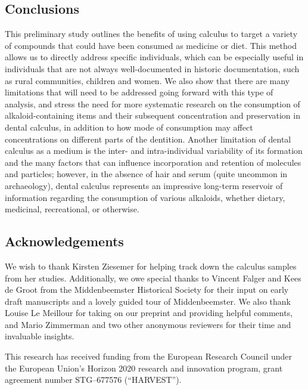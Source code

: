 \documentclass[
]{article}
\begin{document}
\hypertarget{conclusions}{%
\subsection{Conclusions}\label{conclusions}}

This preliminary study outlines the benefits of using calculus to target
a variety of compounds that could have been consumed as medicine or
diet. This method allows us to directly address specific individuals,
which can be especially useful in individuals that are not always
well-documented in historic documentation, such as rural communities,
children and women. We also show that there are many limitations that
will need to be addressed going forward with this type of analysis, and
stress the need for more systematic research on the consumption of
alkaloid-containing items and their subsequent concentration and
preservation in dental calculus, in addition to how mode of consumption
may affect concentrations on different parts of the dentition. Another
limitation of dental calculus as a medium is the inter- and
intra-individual variability of its formation and the many factors that
can influence incorporation and retention of molecules and particles;
however, in the absence of hair and serum (quite uncommon in
archaeology), dental calculus represents an impressive long-term
reservoir of information regarding the consumption of various alkaloids,
whether dietary, medicinal, recreational, or otherwise.

\hypertarget{acknowledgements}{%
\subsection*{Acknowledgements}\label{acknowledgements}}

We wish to thank Kirsten Ziesemer for helping track down the calculus
samples from her studies. Additionally, we owe special thanks to Vincent
Falger and Kees de Groot from the Middenbeemster Historical Society for
their input on early draft manuscripts and a lovely guided tour of
Middenbeemster. We also thank Louise Le Meillour for taking on our
preprint and providing helpful comments, and Mario Zimmerman and two
other anonymous reviewers for their time and invaluable insights.

This research has received funding from the European Research Council
under the European Union's Horizon 2020 research and innovation program,
grant agreement number STG--677576 (``HARVEST'').
\end{document}
